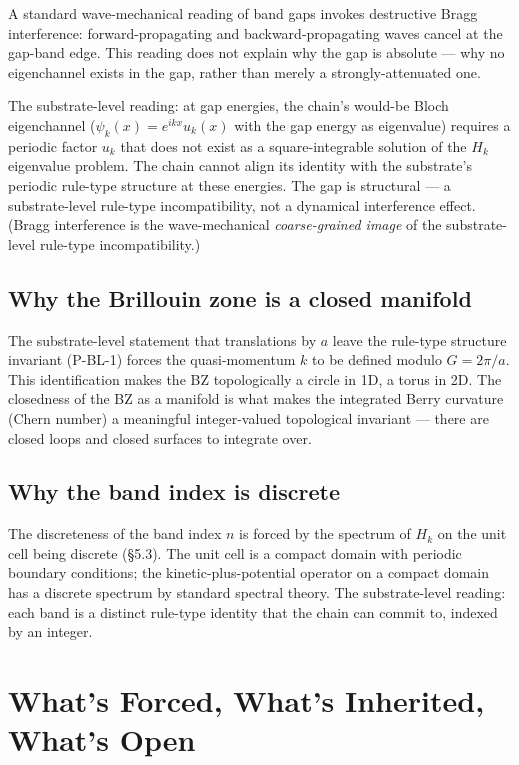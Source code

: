 \documentclass[11pt,a4paper]{article}
\begin{document}
A standard wave-mechanical reading of band gaps invokes destructive Bragg interference: forward-propagating and backward-propagating waves cancel at the gap-band edge. This reading does not explain why the gap is absolute --- why no eigenchannel exists in the gap, rather than merely a strongly-attenuated one.

The substrate-level reading: at gap energies, the chain's would-be Bloch eigenchannel ($\psi_k(x) = e^{ikx}u_k(x)$ with the gap energy as eigenvalue) requires a periodic factor $u_k$ that does not exist as a square-integrable solution of the $H_k$ eigenvalue problem. The chain cannot align its identity with the substrate's periodic rule-type structure at these energies. The gap is structural --- a substrate-level rule-type incompatibility, not a dynamical interference effect. (Bragg interference is the wave-mechanical \emph{coarse-grained image} of the substrate-level rule-type incompatibility.)

\subsection{Why the Brillouin zone is a closed manifold}

The substrate-level statement that translations by $a$ leave the rule-type structure invariant (P-BL-1) forces the quasi-momentum $k$ to be defined modulo $G = 2\pi/a$. This identification makes the BZ topologically a circle in 1D, a torus in 2D. The closedness of the BZ as a manifold is what makes the integrated Berry curvature (Chern number) a meaningful integer-valued topological invariant --- there are closed loops and closed surfaces to integrate over.

\subsection{Why the band index is discrete}

The discreteness of the band index $n$ is forced by the spectrum of $H_k$ on the unit cell being discrete (\S5.3). The unit cell is a compact domain with periodic boundary conditions; the kinetic-plus-potential operator on a compact domain has a discrete spectrum by standard spectral theory. The substrate-level reading: each band is a distinct rule-type identity that the chain can commit to, indexed by an integer.

\section{What's Forced, What's Inherited, What's Open}
\end{document}
